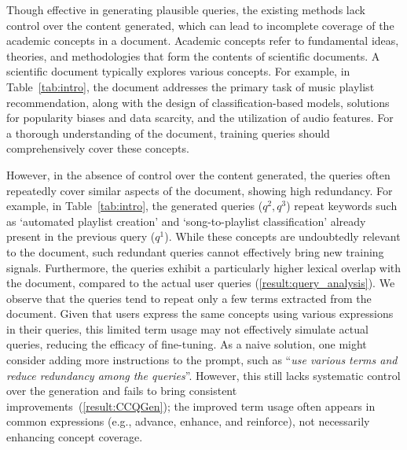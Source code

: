 




Though effective in generating plausible queries, the existing methods lack control over the content generated, which can lead to incomplete coverage of the academic concepts in a document.
Academic concepts refer to fundamental ideas, theories, and methodologies that form the contents of scientific documents. 
A scientific document typically explores various concepts.
For example, in Table~\ref{tab:intro}, the document addresses the primary task of music playlist recommendation, along with the design of classification-based models, solutions for popularity biases and data scarcity, and the utilization of audio features.
For a thorough understanding of the document, training queries should comprehensively cover these concepts.


% 

However, in the absence of control over the content generated, the queries often repeatedly cover similar aspects of the document, showing high redundancy.
For example, in Table~\ref{tab:intro}, the generated queries ($q^2, q^3$) repeat keywords such as `automated playlist creation' and `song-to-playlist classification' already present in the previous query ($q^1$).
While these concepts are undoubtedly relevant to the document, such redundant queries cannot effectively bring new training signals.
Furthermore, the queries exhibit a particularly higher lexical overlap with the document, compared to the actual user queries (\cref{result:query_analysis}).
We observe that the queries tend to repeat only a few terms extracted from the document.
Given that users express the same concepts using various expressions in their queries, this limited term usage may not effectively simulate actual queries, reducing the efficacy of fine-tuning.
As a naive solution, one might consider adding more instructions to the prompt, such as ``\textit{use various terms and reduce redundancy among the queries}''.
However, this still lacks systematic control over the generation and fails to bring consistent improvements~(\cref{result:CCQGen});
the improved term usage often appears in common expressions (e.g., advance, enhance, and reinforce), not necessarily enhancing concept coverage.


